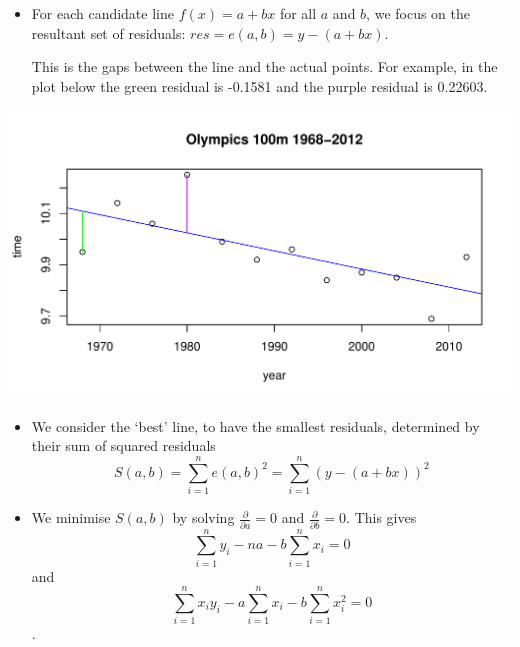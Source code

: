\documentclass[t,xcolor=pdftex,dvipsnames,table]{beamer}\usepackage[]{graphicx}\usepackage[]{color}
\makeatletter
\def\maxwidth{ %
  \ifdim\Gin@nat@width>\linewidth
    \linewidth
  \else
    \Gin@nat@width
  \fi
}
\newenvironment{knitrout}{}{} %
\makeatother
\begin{document}
\begin{frame}[fragile]{}
\begin{itemize}

\item 
For each candidate line $f(x)= a+bx$ for all $a$ and $b$, we focus on the resultant set of residuals: $res = e(a,b) = y-(a+bx)$. 

\vspace{.5cm}
This is the gaps between the line and the actual points.
For example, in the plot below the green residual is -0.1581 and the purple residual is 0.22603.
\end{itemize}

\begin{knitrout}
\color{fgcolor}
\includegraphics[width=\maxwidth]{figure/unnamed-chunk-46-1} 

\end{knitrout}
\end{frame}

\begin{frame}[fragile]{}

\begin{itemize}
\item   
We consider the `best’ line, to have the smallest residuals, determined by their sum of squared residuals 
\[ S(a,b)= \sum_{i=1}^{n} e(a,b)^2 = \sum_{i=1}^{n} (y - (a+bx))^2 \]

\item   
We minimise $S(a,b)$  by solving  $\frac{ \partial}{\partial a} = 0$ and 
$\frac{ \partial}{\partial b} = 0$. This gives 
 \[ \sum_{i=1}^{n} y_{i} - na - b \sum_{i=1}^{n} x_{i} = 0 \]
and
\[\sum_{i=1}^{n} x_{i} y_{i}  -  a \sum_{i=1}^{n} x_{i}   - b \sum_{i=1}^{n} x_{i}^2 = 0 \].

\end{itemize}
\end{frame}
\end{document}
